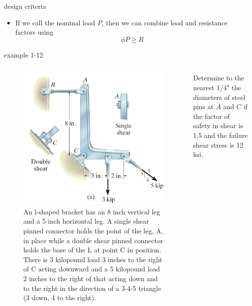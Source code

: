 \documentclass[
  letterpaper,
  ignorenonframetext,
  aspectratio=43,
  handout,
  12pt]{beamer}
\providecommand{\tightlist}{%
  \setlength{\itemsep}{0pt}\setlength{\parskip}{0pt}}
\providecommand{\tightlist}{%
\setlength{\itemsep}{0pt}\setlength{\parskip}{0pt}}
\let\Oldincludegraphics\includegraphics
\renewcommand{\includegraphics}[2][]{\Oldincludegraphics[width=\textwidth,height=0.7\textheight,keepaspectratio]{#2}}
\begin{document}
\begin{frame}{design criteria}
\protect\hypertarget{design-criteria}{}
\begin{itemize}
\tightlist
\item
  If we call the nominal load \(P\), then we can combine load and
  resistance factors using \[\phi P \ge R\]
\end{itemize}
\end{frame}

\begin{frame}{example 1-12}
\protect\hypertarget{example-1-12}{}
\begin{columns}[T]
\begin{column}{0.5\textwidth}
\begin{figure}
\centering
\includegraphics{../images/example-1-12.jpg}
\caption{An l-shaped bracket has an 8 inch vertical leg and a 5 inch
horizontal leg. A single shear pinned connector holds the point of the
leg, A, in place while a double shear pinned connector holds the base of
the L at point C in position. There is 3 kilopound load 3 inches to the
right of C acting downward and a 5 kilopound load 2 inches to the right
of that acting down and to the right in the direction of a 3-4-5
triangle (3 down, 4 to the right).}
\end{figure}
\end{column}

\begin{column}{0.5\textwidth}
Determine to the nearest 1/4" the diameters of steel pins at \(A\) and
\(C\) if the factor of safety in shear is 1.5 and the failure shear
stress is 12 ksi.
\end{column}
\end{columns}
\end{frame}
\end{document}
